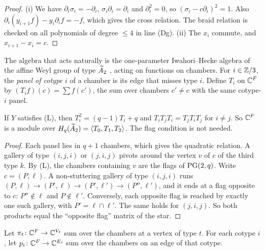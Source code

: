 \begin{proof}
(i) We have $\partial_i\sigma_i=-\partial_i$, $\sigma_i\partial_i=\partial_i$ and $\partial_i^{2}=0$, so
$(\sigma_i-c\partial_i)^{2}=1$. Also $\partial_i(y_{i+1}f)-y_i\partial_if=-f$, which gives the
cross relation. The braid relation is checked on all polynomials of degree $\le4$ in line (Dg).
(ii) The $x_i$ commute, and $x_{i+1}-x_i=c$.
\end{proof}

The algebra that acts naturally is the one-parameter Iwahori--Hecke algebra of the affine Weyl
group of type $\widetilde A_2$ \cite{IM65}, acting on functions on chambers. For $i\in\mathbb{Z}/3$, the
\emph{panel of cotype $i$} of a chamber is its edge that misses type $i$. Define $T_i$ on
$\mathbb{C}^{F}$ by $(T_if)(c)=\sum f(c')$, the sum over chambers $c'\ne c$ with the same cotype-$i$
panel.

\begin{theorem}\label{V3P6:thm:iwahori}
If $Y$ satisfies \textup{(L)}, then $T_i^{2}=(q-1)T_i+q$ and $T_iT_jT_i=T_jT_iT_j$ for
$i\neq j$. So $\mathbb{C}^{F}$ is a module over $H_q(\widetilde A_2)=\langle T_0,T_1,T_2\rangle$. The flag
condition is not needed.
\end{theorem}

\begin{proof}
Each panel lies in $q+1$ chambers, which gives the quadratic relation. A gallery of type
$(i,j,i)$ or $(j,i,j)$ pivots around the vertex $v$ of $c$ of the third type $k$. By (L), the
chambers containing $v$ are the flags of $\mathrm{PG}(2,q)$. Write $c=(P,\ell)$. A non-stuttering
gallery of type $(i,j,i)$ runs $(P,\ell)\to(P',\ell)\to(P',\ell')\to(P'',\ell')$, and it ends at
a flag opposite to $c$: $P''\notin\ell$ and $P\notin\ell'$. Conversely, each opposite flag is
reached by exactly one such gallery, with $P'=\ell\cap\ell'$. The same holds for $(j,i,j)$. So
both products equal the ``opposite flag'' matrix of the star.
\end{proof}

Let $\pi_t\colon\mathbb{C}^{F}\to\mathbb{C}^{V_t}$ sum over the chambers at a vertex of type $t$. For each
cotype $i$, let $p_i\colon\mathbb{C}^{F}\to\mathbb{C}^{E_i}$ sum over the chambers on an edge of that cotype.

